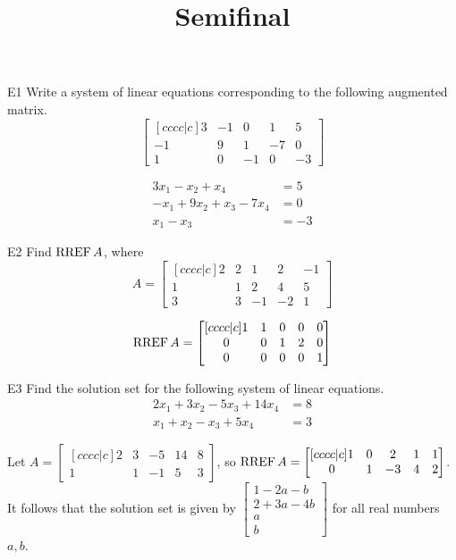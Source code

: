 \documentclass{sbgLAsemi}
\title{Semifinal}
\begin{document}
\begin{problem}{E1}
Write a system of linear equations corresponding to the following
augmented matrix.
\[
\begin{bmatrix}[cccc|c]
3 & -1 & 0 & 1 & 5 \\
-1 & 9 & 1 & -7 & 0 \\
1 & 0 & -1 & 0 & -3
\end{bmatrix}
\]
\end{problem}
\begin{solution}
\begin{align*}
3x_1-x_2+x_4 &= 5 \\
-x_1+9x_2+x_3-7x_4 &= 0 \\
x_1-x_3 &= -3
\end{align*}
\end{solution}

\begin{problem}{E2}
Find \(\operatorname{RREF} A\), where
\[
  A =
  \begin{bmatrix}[cccc|c]
    2 & 2 & 1 & 2 & -1 \\
    1 & 1 & 2 & 4 & 5 \\
    3 & 3 & -1 & -2 & 1
  \end{bmatrix}
\]
\end{problem}
\begin{solution}
\[
  \operatorname{RREF} A =
  \begin{bmatrix}[cccc|c]
    1 & 1 & 0 & 0 & 0 \\
    0 & 0 & 1 & 2 & 0 \\
    0 & 0 & 0 & 0 & 1
  \end{bmatrix}
\]
\end{solution}
\begin{problem}{E3}
Find the solution set for the following system of linear equations.
\begin{align*}
2x_1+3x_2-5x_3+14x_4 &= 8 \\
x_1+x_2-x_3+5x_4&= 3
\end{align*}
\end{problem}
\begin{solution}
Let \(A =
  \begin{bmatrix}[cccc|c]
    2 & 3 & -5 & 14 & 8 \\
    1 & 1 & -1 & 5 & 3
  \end{bmatrix}
\), so \(\operatorname{RREF} A =
  \begin{bmatrix}[cccc|c]
    1 & 0 & 2 & 1 & 1 \\
    0 & 1 & -3 & 4 & 2 \\
  \end{bmatrix}
\). It follows that the solution set is given by \(
  \begin{bmatrix}
    1 - 2a - b \\
    2 + 3a - 4b \\
    a \\
    b
  \end{bmatrix}
\) for all real numbers \(a,b\).
\end{solution}
\end{document}
